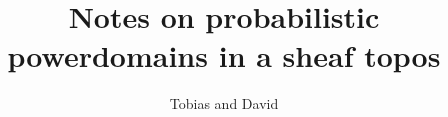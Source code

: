 \documentclass[11pt, book]{memoir}
\theoremstyle{plain}
\theoremstyle{definition}
\theoremstyle{remark}
\begin{document}
\title{Notes on probabilistic powerdomains in a sheaf topos}

\author{Tobias and David}

\maketitle

\tableofcontents*
\end{document}

